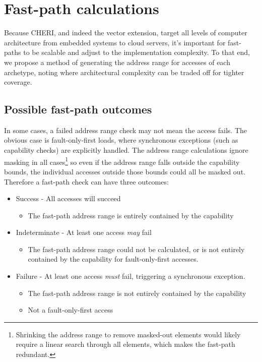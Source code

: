 \section{Fast-path calculations}
Because CHERI, and indeed the vector extension, target all levels of computer architecture from embedded systems to cloud servers, it's important for fast-paths to be scalable and adjust to the implementation complexity.
To that end, we propose a method of generating the address range for accesses of each archetype, noting where architectural complexity can be traded off for tighter coverage.

\subsection{Possible fast-path outcomes}
In some cases, a failed address range check may not mean the access fails.
The obvious case is fault-only-first loads, where synchronous exceptions (such as capability checks) are explicitly handled.
The address range calculations ignore masking in all cases\footnote{Shrinking the address range to remove masked-out elements would likely require a linear search through all elements, which makes the fast-path redundant.} so even if the address range falls outside the capability bounds, the individual accesses outside those bounds could all be masked out.
Therefore a fast-path check can have three outcomes:
\begin{itemize}
    \item Success - All accesses will succeed
    \begin{itemize}
        \item The fast-path address range is entirely contained by the capability
    \end{itemize}
    \item Indeterminate - At least one access \emph{may} fail
    \begin{itemize}
        \item The fast-path address range could not be calculated, or is not entirely contained by the capability for fault-only-first accesses.
    \end{itemize}
    \item Failure - At least one access \emph{must} fail, triggering a synchronous exception.
    \begin{itemize}
        \item The fast-path address range is not entirely contained by the capability
        \item Not a fault-only-first access
    \end{itemize}
\end{itemize}

